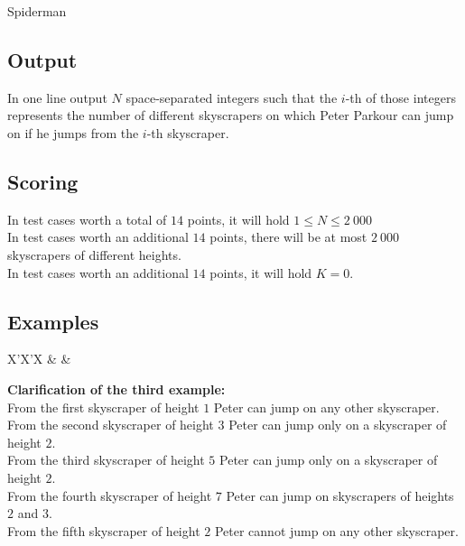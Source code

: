 \begin{statement}[
  problempoints=70,
  timelimit=1 second,
  memorylimit=512 MiB,
]{Spiderman}
\subsection*{Output}
In one line output $N$ space-separated integers such that the $i$-th of
those integers represents the number of different skyscrapers on which
Peter Parkour can jump on if he jumps from the $i$-th skyscraper.

\subsection*{Scoring}
In test cases worth a total of $14$ points, it will hold $1 \le N \le 2\ 000$\\
In test cases worth an additional $14$ points, there will be at most $2\ 000$
skyscrapers of different heights. \\
In test cases worth an additional $14$ points, it will hold $K = 0$.

\subsection*{Examples}
\begin{tabularx}{\textwidth}{X'X'X}
 &
 &
\end{tabularx}

\textbf{Clarification of the third example:}\\
From the first skyscraper of height $1$ Peter can jump on any other skyscraper.\\
From the second skyscraper of height $3$ Peter can jump only on a skyscraper of  height $2$.\\
From the third skyscraper of height $5$ Peter can jump only on a skyscraper of height $2$.\\
From the fourth skyscraper of height $7$ Peter can jump on skyscrapers of heights $2$ and $3$.\\
From the fifth skyscraper of height $2$ Peter cannot jump on any other skyscraper.

\end{statement}


